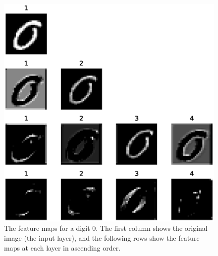 \documentclass[
	12pt, %
]{../Template/fphw}
\begin{document}
\begin{enumerate}[label = (\arabic*)]
    \begin{figure}[!htbp]
    \centering
    \includegraphics{codes/feature_maps_0}
    \caption{The feature maps for a digit $0$. The first column shows the original image (the input layer), and the following rows show the feature maps at each layer in ascending order.}
    \label{fig:feature_maps_0}
    \end{figure}


\end{enumerate}
\end{document}
